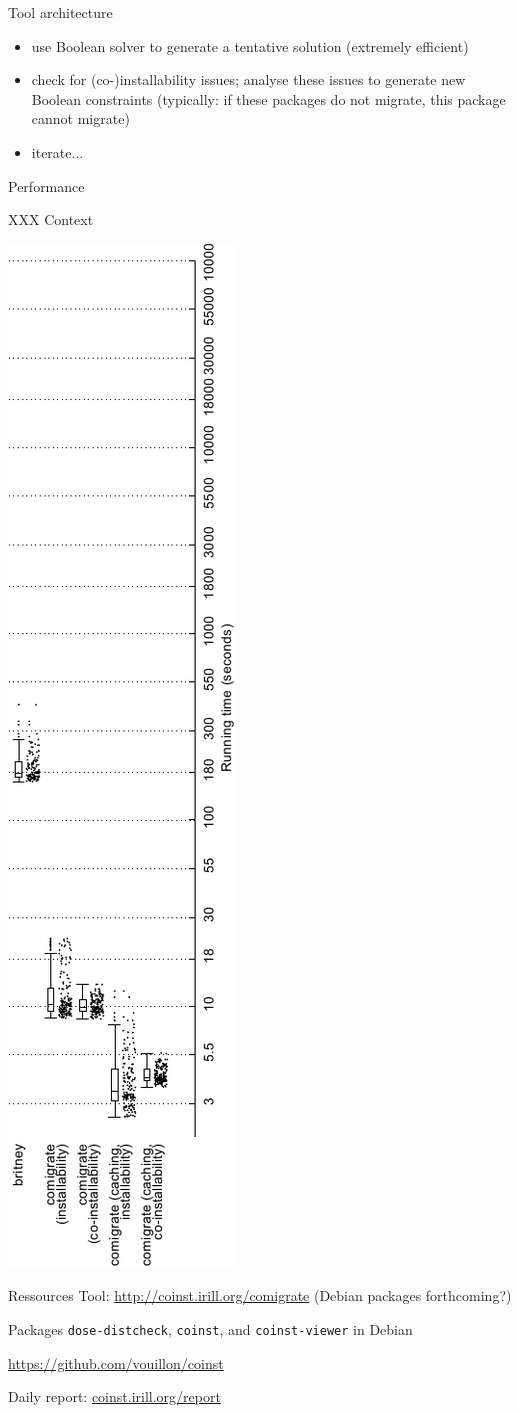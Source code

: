 \documentclass[xcolor={dvipsnames}]{beamer}
\begin{document}
\begin{frame}{Tool architecture}

\begin{itemize}
\item
 use Boolean solver to generate a tentative solution
  (extremely efficient)
\item
 check for (co-)installability issues;
  analyse these issues to generate new Boolean constraints
  (typically: if these packages do not migrate, this package cannot migrate)
\item iterate...
\end{itemize}
\end{frame}

\begin{frame}{Performance}

XXX Context

\includegraphics[height=\linewidth,angle=-90]{figures/performance.pdf}
\end{frame}

\begin{frame}{Ressources}
Tool: \url{http://coinst.irill.org/comigrate}
(Debian packages forthcoming?)

Packages \texttt{dose-distcheck}, \texttt{coinst}, and
\texttt{coinst-viewer} in Debian

\url{https://github.com/vouillon/coinst}

Daily report:
\url{coinst.irill.org/report}
\end{frame}
\end{document}
